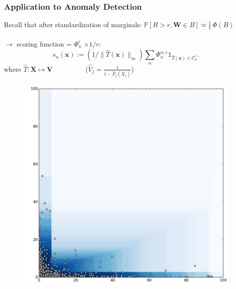 \documentclass[9pt]{beamer}
\def\mb{\mathbf}
\begin{document}






\begin{frame}
\frametitle{Application to Anomaly Detection}

Recall that after standardization of marginals: 
$\mathbb{P}[R> r  ,\mb W \in B ]  \simeq \frac{1}{r}\,\Phi(B)$ \\~\\
 $\rightarrow$ scoring function = $\Phi_n^\epsilon$  $\times 1/r:$
$$s_n(\mb x):= (1/\|\hat T(\mb x)\|_\infty) \sum_{\alpha }\Phi_n^{\alpha, \epsilon} \mathds{1}_{\hat T(\mb x) \in \mathcal{C}_\alpha^\epsilon}.$$
 where $\hat T: \mb X \mapsto \mb V$ ~~~~~~~~~($\hat V_{j} = \frac{1}{1- \hat F_j (X_{j})} $)

  \begin{figure}
    \centering
    \includegraphics[scale=0.206, trim=2cm 0cm 2cm 1cm]{sourcefigs/plot_damex_level_sets}
  \end{figure}

\end{frame}
\end{document}
